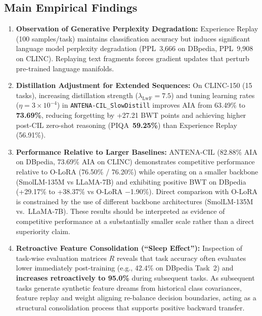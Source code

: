 \documentclass[11pt,a4paper]{article}
\begin{document}
\subsection{Main Empirical Findings}

\begin{enumerate}
    \item \textbf{Observation of Generative Perplexity Degradation:} Experience Replay (100 samples/task) maintains classification accuracy but induces significant language model perplexity degradation (PPL~3,666 on DBpedia, PPL~9,908 on CLINC). Replaying text fragments forces gradient updates that perturb pre-trained language manifolds.

    \item \textbf{Distillation Adjustment for Extended Sequences:} On CLINC-150 (15 tasks), increasing distillation strength ($\lambda_{\text{LwF}} = 7.5$) and tuning learning rates ($\eta = 3 \times 10^{-4}$) in \texttt{ANTENA-CIL\_SlowDistill} improves AIA from 63.49\% to \textbf{73.69\%}, reducing forgetting by +27.21 BWT points and achieving higher post-CIL zero-shot reasoning (PIQA~\textbf{59.25\%}) than Experience Replay (56.91\%).

    \item \textbf{Performance Relative to Larger Baselines:} ANTENA-CIL (82.88\% AIA on DBpedia, 73.69\% AIA on CLINC) demonstrates competitive performance relative to O-LoRA (76.50\% / 76.20\%) while operating on a smaller backbone (SmolLM-135M vs LLaMA-7B) and exhibiting positive BWT on DBpedia (+29.17\% to +38.37\% vs O-LoRA $-$1.90\%). Direct comparison with O-LoRA is constrained by the use of different backbone architectures (SmolLM-135M vs.\ LLaMA-7B). These results should be interpreted as evidence of competitive performance at a substantially smaller scale rather than a direct superiority claim.

    \item \textbf{Retroactive Feature Consolidation (``Sleep Effect''):} Inspection of task-wise evaluation matrices $R$ reveals that task accuracy often evaluates lower immediately post-training (e.g., 42.4\% on DBpedia Task~2) and \textbf{increases retroactively to 95.0\%} during subsequent tasks. As subsequent tasks generate synthetic feature dreams from historical class covariances, feature replay and weight aligning re-balance decision boundaries, acting as a structural consolidation process that supports positive backward transfer.
\end{enumerate}
\end{document}
